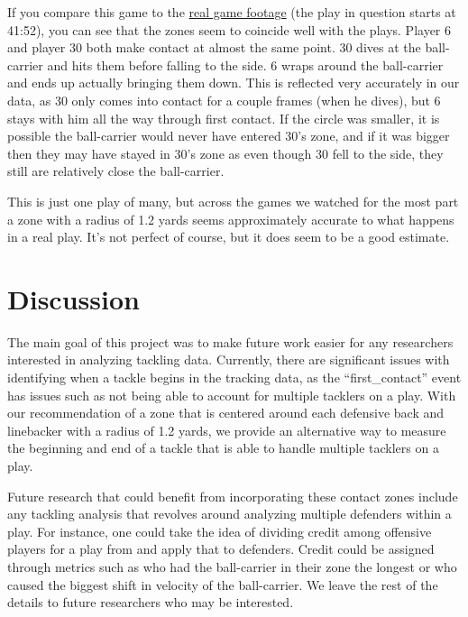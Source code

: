 \documentclass[
  12pt]{article}
\begin{document}
If you compare this game to the
\href{https://nfl-video.com/new-orleans-saints-vs-atlanta-falcons-full-game-replay-2022-nfl-week-1}{real
game footage} (the play in question starts at 41:52), you can see that
the zones seem to coincide well with the plays. Player 6 and player 30
both make contact at almost the same point. 30 dives at the ball-carrier
and hits them before falling to the side. 6 wraps around the
ball-carrier and ends up actually bringing them down. This is reflected
very accurately in our data, as 30 only comes into contact for a couple
frames (when he dives), but 6 stays with him all the way through first
contact. If the circle was smaller, it is possible the ball-carrier
would never have entered 30's zone, and if it was bigger then they may
have stayed in 30's zone as even though 30 fell to the side, they still
are relatively close the ball-carrier.

This is just one play of many, but across the games we watched for the
most part a zone with a radius of 1.2 yards seems approximately accurate
to what happens in a real play. It's not perfect of course, but it does
seem to be a good estimate.

\section{Discussion}\label{discussion}

The main goal of this project was to make future work easier for any
researchers interested in analyzing tackling data. Currently, there are
significant issues with identifying when a tackle begins in the tracking
data, as the ``first\_contact'' event has issues such as not being able
to account for multiple tacklers on a play. With our recommendation of a
zone that is centered around each defensive back and linebacker with a
radius of 1.2 yards, we provide an alternative way to measure the
beginning and end of a tackle that is able to handle multiple tacklers
on a play.

Future research that could benefit from incorporating these contact
zones include any tackling analysis that revolves around analyzing
multiple defenders within a play. For instance, one could take the idea
of dividing credit among offensive players for a play from
\citet{Yurko2019} and apply that to defenders. Credit could be assigned
through metrics such as who had the ball-carrier in their zone the
longest or who caused the biggest shift in velocity of the ball-carrier.
We leave the rest of the details to future researchers who may be
interested.
\end{document}
